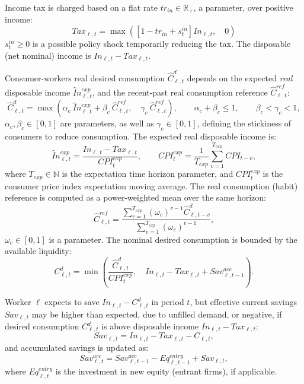 \documentclass[a4paper,11pt]{article}
\begin{document}
\begin{appendices}
Income tax is charged based on a flat rate ${tr}_{in} \in \mathbb{R}_+$, a parameter, over positive income:
\begin{equation}
	Tax_{\ell,t} = \max{ \left( \left[ 1 - {tr}_{in} + s_t^{in} \right] In_{\ell,t}, \quad 0 \right) }
\end{equation}
$s_t^{in} \ge 0$ is a possible policy shock temporarily reducing the tax. The disposable (net nominal) income is $In_{\ell,t} - Tax_{\ell,t}$.

Consumer-workers real desired consumption $\hat{C}_{\ell,t}^d$ depends on the expected \emph{real} disposable income $\hat{I}n_{\ell,t}^{exp}$, and the recent-past real consumption reference $\hat{C}_{\ell,t}^{ref}$:
\begin{equation}
	\hat{C}_{\ell,t}^d = \max{ \left( \alpha_c ~ \hat{I}n_{\ell,t}^{exp} + \beta_c ~ \hat{C}_{\ell,t}^{ref}, \quad \gamma_c ~ \hat{C}_{\ell,t}^{ref} \right) },
	\qquad \alpha_c + \beta_c \le 1,
	\qquad \beta_c < \gamma_c < 1,
\end{equation}
$\alpha_c, \beta_c \in [0, 1]$ are parameters, as well as $\gamma_c \in [0, 1]$, defining the stickiness of consumers to reduce consumption. The expected real disposable income is:
\begin{equation}
	\hat{I}n_{\ell,t}^{exp} = \dfrac{ In_{\ell,t} - Tax_{\ell,t} }{ CPI_t^{exp} },
	\qquad CPI_t^{exp} = \frac{ 1 }{ T_{exp} } \sum_{ v = 1 }^{ T_{exp} } CPI_{t-v},
\end{equation}
where $T_{exp} \in \mathbb{N}$ is the expectation time horizon parameter, and $CPI_t^{exp}$ is the consumer price index expectation moving average. The real consumption (habit) reference is computed as a power-weighted mean over the same horizon:
\begin{equation}
	\hat{C}_{\ell,t}^{ref} = \frac{ \sum_{ v = 1 }^{ T_{exp} } \left( \omega_c \right)^{ v - 1 } \hat{C}_{\ell,t-v}^d }{ \sum_{ v = 1 }^{ T_{exp} } \left( \omega_c \right)^{ v - 1 } },
\end{equation}
$\omega_c \in [0, 1]$ is a parameter.
The nominal desired consumption is bounded by the available liquidity:
\begin{equation}
	C_{\ell,t}^d = \min{ \left( \dfrac{ \hat{C}_{\ell,t}^d }{ CPI_t^{exp} }, \quad In_{\ell,t} - Tax_{\ell,t} + Sav_{\ell,t-1}^{acc} \right) }.
\end{equation}

Worker $\ell$ expects to save $In_{\ell,t} - C_{\ell,t}^d$ in period $t$, but effective current savings $Sav_{\ell,t}$ may be higher than expected, due to unfilled demand, or negative, if desired consumption $C_{\ell,t}^d$ is above disposable income $In_{\ell,t} - Tax_{\ell,t}$:
\begin{equation}
	Sav_{\ell,t} = In_{\ell,t} - Tax_{\ell,t} - C_{\ell,t},
\end{equation}
and accumulated savings is updated as:
\begin{equation}
	Sav_{\ell,t}^{acc} = Sav_{\ell,t-1}^{acc} - Eq_{\ell,t-1}^{entry} + Sav_{\ell,t},
\end{equation}
where $Eq_{\ell,t}^{entry}$ is the investment in new equity (entrant firms), if applicable.



\end{appendices}
\end{document}
